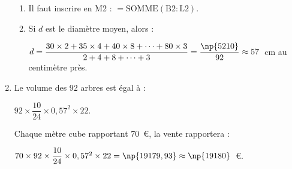 \begin{enumerate}
	\begin{enumerate}
		\item %
Il faut inscrire en M2 : $=\text{SOMME}(\text{B}2 : \text{L}2)$.
		\item %
Si $d$ est le diamètre moyen, alors :

$d = \dfrac{30 \times 2 + 35  \times  4 + 40  \times  8 + \cdots + 80  \times  3}{2 + 4 + 8 + \cdots + 3} = \dfrac{\np{5210}}{92} \approx 57$~cm au centimètre près.
	\end{enumerate}
\item %

%
%
%
Le volume des 92 arbres est égal à :

$92 \times \dfrac{10}{24} \times 0,57^2 \times 22$.

Chaque mètre cube rapportant 70~\euro{}, la vente rapportera :

$70 \times 92 \times \dfrac{10}{24} \times 0,57^2 \times 22 = \np{19179,93} \approx \np{19180}$~\euro.
\end{enumerate}

\vspace{0,5cm}

